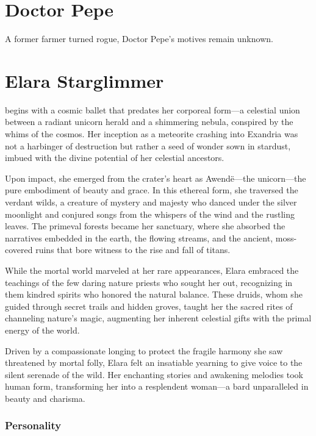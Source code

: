 \documentclass[
  letterpaper,12pt,twoside,twocolumn,openany,
  nodeprecatedcode,bg=full]{dndbook}
\begin{document}
\chapter{Doctor Pepe}\label{doctor-pepe-1}

A former farmer turned rogue, Doctor Pepe's motives remain unknown.

\chapter{Elara Starglimmer}\label{elara-starglimmer}

\hfill\break begins with a
cosmic ballet that predates her corporeal form---a celestial union
between a radiant unicorn herald and a shimmering nebula, conspired by
the whims of the cosmos. Her inception as a meteorite crashing into
Exandria was not a harbinger of destruction but rather a seed of wonder
sown in stardust, imbued with the divine potential of her celestial
ancestors.

Upon impact, she emerged from the crater's heart as Awendë---the
unicorn---the pure embodiment of beauty and grace. In this ethereal
form, she traversed the verdant wilds, a creature of mystery and majesty
who danced under the silver moonlight and conjured songs from the
whispers of the wind and the rustling leaves. The primeval forests
became her sanctuary, where she absorbed the narratives embedded in the
earth, the flowing streams, and the ancient, moss-covered ruins that
bore witness to the rise and fall of titans.

While the mortal world marveled at her rare appearances, Elara embraced
the teachings of the few daring nature priests who sought her out,
recognizing in them kindred spirits who honored the natural balance.
These druids, whom she guided through secret trails and hidden groves,
taught her the sacred rites of channeling nature's magic, augmenting her
inherent celestial gifts with the primal energy of the world.

Driven by a compassionate longing to protect the fragile harmony she saw
threatened by mortal folly, Elara felt an insatiable yearning to give
voice to the silent serenade of the wild. Her enchanting stories and
awakening melodies took human form, transforming her into a resplendent
woman---a bard unparalleled in beauty and charisma.

\subsection{Personality}\label{personality}
\end{document}
